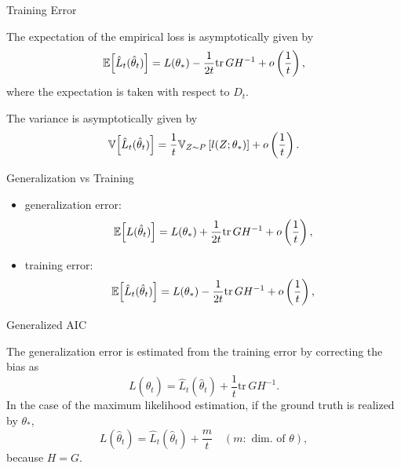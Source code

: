 \documentclass[fleqn,aspectratio=1610]{beamer}
\begin{document}
\begin{frame}[label={sec:orgb8ad6b6}]{Training Error}
\begin{theorem}[]\label{sec:orgaed9de3}
The expectation of the empirical loss is asymptotically given by
\begin{equation}
  \mathbb{E}\Bigl[\hat{L}_{t}(\hat\theta_{t})\Bigr]
  =L(\theta_{*})
  -\frac{1}{2t}\mathrm{tr}\, GH^{-1}
  +o\left(\frac{1}{t}\right),
\end{equation}
where the expectation is taken with respect to \(D_{t}\).

The variance is asymptotically given by
\begin{equation}
  \mathbb{V}\Bigl[\hat{L}_{t}(\hat\theta_{t})\Bigr]
  =\frac{1}{t}\mathbb{V}_{Z\sim P}\left[l(Z;\theta_{*})\right]
  +o\left(\frac{1}{t}\right).
\end{equation}
\end{theorem}
\end{frame}
\begin{frame}[label={sec:orgb5f1898}]{Generalization vs Training}
\begin{itemize}
\item generalization error:
\begin{equation}
  \mathbb{E}\Bigl[L(\hat\theta_{t})\Bigr]
  =L(\theta_*)
  +\frac{1}{2t}\mathrm{tr}\, GH^{-1}
  +o\left(\frac{1}{t}\right),
\end{equation}
\item training error:
\begin{equation}
  \mathbb{E}\Bigl[\hat{L}_{t}(\hat\theta_{t})\Bigr]
  =L(\theta_{*})
  -\frac{1}{2t}\mathrm{tr}\, GH^{-1}
  +o\left(\frac{1}{t}\right),
\end{equation}
\end{itemize}
\end{frame}
\begin{frame}[label={sec:org552e895}]{Generalized AIC}
\begin{corollary}[Akaike, 1974]\label{sec:org4e2c7bd}
The generalization error is
estimated from the training error by correcting the bias as
\begin{equation}
  L(\hat\theta_{t})
  =
  \hat{L}_{t}(\hat\theta_{t})
  +\frac{1}{t}\mathrm{tr}\, GH^{-1}.
\end{equation}
In the case of the maximum likelihood estimation,
if the ground truth is realized by \(\theta_{*}\), 
\begin{equation}
  L(\hat\theta_{t})
  =
  \hat{L}_{t}(\hat\theta_{t})
  +\frac{m}{t}\quad (m:\text{ dim.\ of }\theta),
\end{equation}
because \(H=G\).
\end{corollary}
\end{frame}
\end{document}
